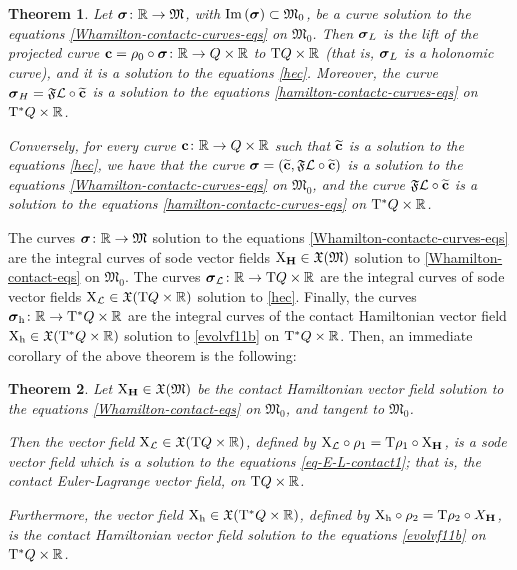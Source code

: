 \documentclass[12pt]{report}
\newtheorem{teor}{Theorem}[chapter]
\def\vf{\mathfrak X}
\def\Lag{{\cal L}}
\def\Real{\mathbb{R}}
\def\X{{\rm X}}
\def\Tan{{\rm T}}
\begin{document}
\begin{teor}
Let $\mbox{\boldmath $\sigma$}\colon\Real\to\mathfrak{M}$,
with  ${\rm Im}\,(\mbox{\boldmath $\sigma$})\subset\mathfrak{M}_0$,
be a curve solution to the equations \eqref{Whamilton-contactc-curves-eqs}
on $\mathfrak{M}_0$.
Then
$\mbox{\boldmath $\sigma$}_L$ is the lift of the projected curve
${\bf c}=\rho_0\circ\mbox{\boldmath $\sigma$}\colon\Real\to Q\times\Real$
to $\Tan Q\times\Real$ (that is, $\mbox{\boldmath $\sigma$}_L$ is
a holonomic curve),
and it is a solution to the equations \eqref{hec}.
Moreover, the curve 
$\mbox{\boldmath $\sigma$}_H=
\mathfrak{F}\Lag\circ\widetilde{\bf c}$
is a solution to the equations \eqref{hamilton-contactc-curves-eqs} on $\Tan^*Q\times\Real$.

Conversely, for every curve ${\bf c}\colon\Real\to Q\times\Real$ such that
$\widetilde{\bf c}$ is a solution to the equations \eqref{hec}, we have that the curve 
$\mbox{\boldmath $\sigma$}=(\widetilde{\bf c},\mathfrak{F}\Lag\circ\widetilde{\bf c})$
is a solution to the equations \eqref{Whamilton-contactc-curves-eqs} on $\mathfrak{M}_0$,
and the curve $\mathfrak{F}\Lag\circ\widetilde{\bf c}$
is a solution to the equations \eqref{hamilton-contactc-curves-eqs} on $\Tan^*Q\times\Real$.
 \label{mainteor01}
\end{teor}

The curves $\mbox{\boldmath $\sigma$}\colon\Real\to\mathfrak{M}$ 
solution to the equations \eqref{Whamilton-contactc-curves-eqs}
are the integral curves of {\sc sode} vector fields $\X_{\bf H}\in\vf(\mathfrak{M})$ 
solution to \eqref{Whamilton-contact-eqs} on $\mathfrak{M}_0$.
The curves $\mbox{\boldmath $\sigma$}_\Lag\colon\Real\to\Tan Q\times\Real$
are the integral curves of {\sc sode} vector fields $\X_\Lag\in\vf(\Tan Q\times\Real)$ 
solution to  \eqref{hec}.
Finally, the curves
$\mbox{\boldmath $\sigma$}_{\rm h}\colon\Real\to\Tan^*Q\times\Real$
are the integral curves of the contact Hamiltonian vector field $\X_{\rm h}\in\vf(\Tan^*Q\times\Real)$ 
solution to \eqref{evolvf11b} on $\Tan^*Q\times\Real$.
Then, an immediate corollary of the above theorem is the following:

\begin{teor}
Let $\X_{\bf H}\in\vf(\mathfrak{M})$ be the contact Hamiltonian vector field
solution to the equations \eqref{Whamilton-contact-eqs}
on $\mathfrak{M}_0$, and tangent to 
$\mathfrak{M}_0$.

Then the vector field $\X_\Lag\in\vf(\Tan Q\times\Real)$, defined by
$\X_\Lag\circ\rho_1=\Tan\rho_1\circ\X_{\bf H}$,
is a {\sc sode} vector field which is a
solution to the equations \eqref{eq-E-L-contact1}; that is, the contact Euler-Lagrange vector field,
on $\Tan Q\times\Real$.

Furthermore, the vector field $\X_{\rm h}\in\vf(\Tan^*Q\times\Real)$, defined by
$\X_{\rm h}\circ\rho_2=\Tan\rho_2\circ X_{\bf H}$,
is the contact Hamiltonian vector field solution to the equations \eqref{evolvf11b} on $\Tan^*Q\times\Real$.
\end{teor}
\end{document}
